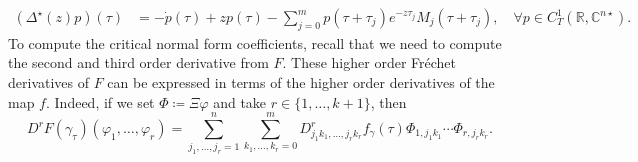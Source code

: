\documentclass[english]{myarticle}
\begin{document}
\begin{sloppypar}
\begin{align*}
    (\Delta^\star(z)p)(\tau) &= - \dot{p}(\tau) + z p(\tau) - \sum_{j=0}^m p(\tau + \tau_j)e^{-z \tau_j} M_j(\tau + \tau_j), \quad \forall p \in C_T^1(\mathbb{R},\mathbb{C}^{n \star}).
\end{align*}
To compute the critical normal form coefficients, recall that we need to compute the second and third order derivative from $F$. These higher order Fr\'echet derivatives of $F$ can be expressed in terms of the higher order derivatives of the map $f$. Indeed, if we set $\Phi \coloneqq \Xi \varphi$ and take $r \in \{1,\dots,k+1\}$, then 
\begin{equation} \label{D^r F}
    D^r F(\gamma_\tau)(\varphi_1,\dots,\varphi_r) = \sum_{j_1,\dots,j_r = 1}^{n} \sum_{k_1,\dots,k_r = 0}^m
    D_{{j_1k_1},\dots,{j_r k_r}}^r f_\gamma(\tau) \Phi_{1,j_1k_1}\cdots \Phi_{r,j_r k_r}.
\end{equation}


\end{sloppypar}
\end{document}
